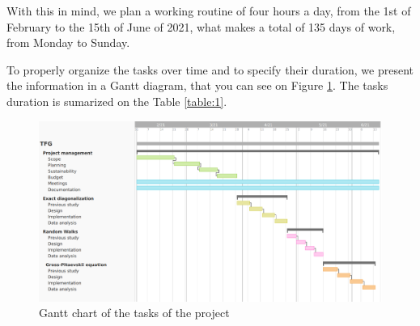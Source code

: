 \documentclass{article}
\begin{document}
With this in mind, we plan a working routine of four hours a day, from the 1st of February to the 15th of June of 2021, what makes a total of 135 days of work, from Monday to Sunday.

To properly organize the tasks over time and to specify their duration, we present the information in a Gantt diagram, that you can see on Figure \ref{figure:gantt}. The tasks duration is sumarized on the Table \ref{table:1}.

\begin{figure}[h!]
    \centering
    \includegraphics[angle=90, scale=0.45]{./Gantt.PNG}
    \caption{Gantt chart of the tasks of the project}
    \label{figure:gantt}
\end{figure}
\end{document}
